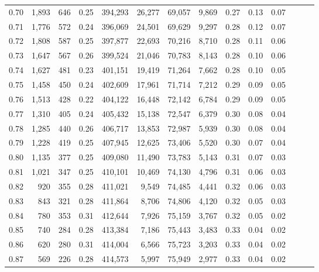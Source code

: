 \begin{tabular}{rrrrrrrrrrrrrr}
0.70 &   1,893 &    646 &  0.25 &  394,293 &   26,277 &  69,057 &   9,869 &  0.27 &  0.13 &      0.07 \\
0.71 &   1,776 &    572 &  0.24 &  396,069 &   24,501 &  69,629 &   9,297 &  0.28 &  0.12 &      0.07 \\
0.72 &   1,808 &    587 &  0.25 &  397,877 &   22,693 &  70,216 &   8,710 &  0.28 &  0.11 &      0.06 \\
0.73 &   1,647 &    567 &  0.26 &  399,524 &   21,046 &  70,783 &   8,143 &  0.28 &  0.10 &      0.06 \\
0.74 &   1,627 &    481 &  0.23 &  401,151 &   19,419 &  71,264 &   7,662 &  0.28 &  0.10 &      0.05 \\
0.75 &   1,458 &    450 &  0.24 &  402,609 &   17,961 &  71,714 &   7,212 &  0.29 &  0.09 &      0.05 \\
0.76 &   1,513 &    428 &  0.22 &  404,122 &   16,448 &  72,142 &   6,784 &  0.29 &  0.09 &      0.05 \\
0.77 &   1,310 &    405 &  0.24 &  405,432 &   15,138 &  72,547 &   6,379 &  0.30 &  0.08 &      0.04 \\
0.78 &   1,285 &    440 &  0.26 &  406,717 &   13,853 &  72,987 &   5,939 &  0.30 &  0.08 &      0.04 \\
0.79 &   1,228 &    419 &  0.25 &  407,945 &   12,625 &  73,406 &   5,520 &  0.30 &  0.07 &      0.04 \\
0.80 &   1,135 &    377 &  0.25 &  409,080 &   11,490 &  73,783 &   5,143 &  0.31 &  0.07 &      0.03 \\
0.81 &   1,021 &    347 &  0.25 &  410,101 &   10,469 &  74,130 &   4,796 &  0.31 &  0.06 &      0.03 \\
0.82 &     920 &    355 &  0.28 &  411,021 &    9,549 &  74,485 &   4,441 &  0.32 &  0.06 &      0.03 \\
0.83 &     843 &    321 &  0.28 &  411,864 &    8,706 &  74,806 &   4,120 &  0.32 &  0.05 &      0.03 \\
0.84 &     780 &    353 &  0.31 &  412,644 &    7,926 &  75,159 &   3,767 &  0.32 &  0.05 &      0.02 \\
0.85 &     740 &    284 &  0.28 &  413,384 &    7,186 &  75,443 &   3,483 &  0.33 &  0.04 &      0.02 \\
0.86 &     620 &    280 &  0.31 &  414,004 &    6,566 &  75,723 &   3,203 &  0.33 &  0.04 &      0.02 \\
0.87 &     569 &    226 &  0.28 &  414,573 &    5,997 &  75,949 &   2,977 &  0.33 &  0.04 &      0.02 \\

\end{tabular}
